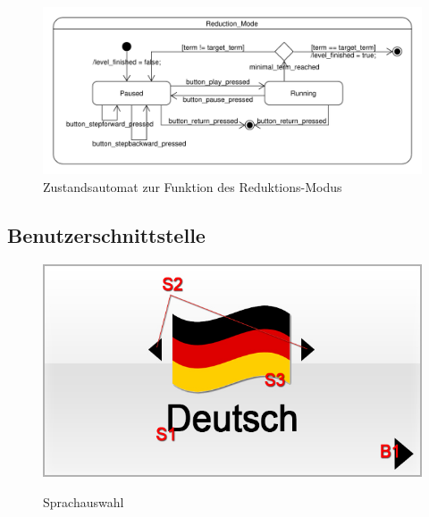 \begin{figure}[H]
\centering
\includegraphics[scale=0.55]{../system_models/dynamic_models/reduction_mode_state_machine.pdf}
\caption{Zustandsautomat zur Funktion des Reduktions-Modus}
\end{figure}


\subsection{Benutzerschnittstelle}
\begin{figure}[H]

\centering
{}\label{fig:Sprachauswahl}
\includegraphics[scale=0.55]{../gui/_jpeg_numeration/registration1.jpg}

\caption{Sprachauswahl}


\end{figure}

